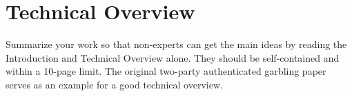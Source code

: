 \section{Technical Overview}
\label{sec-overview}

Summarize your work so that non-experts can get the main ideas by reading the Introduction and Technical Overview alone. They should be self-contained and within a 10-page limit. The original two-party authenticated garbling paper~\cite{CCS:WanRanKat17a} serves as an example for a good technical overview.